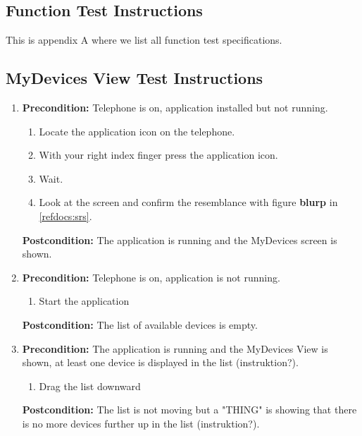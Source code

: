 \documentclass[a4paper]{article}
\newlength{\testlabellength}
\newenvironment{testlist}{\begin{enumerate}[label=\bfseries Instruction \thesubsection.\arabic* , labelindent=0pt, labelwidth=\testlabellength , leftmargin=2cm]}{\end{enumerate}}
\begin{document}
\newpage
\begin{appendices}

\section{Function Test Instructions} \label{appendix:section:functiontest}
This is appendix A where we list all function test specifications.

\subsection{MyDevices View Test Instructions}
\begin{testlist}

    \item \vspace{5mm} \textbf{Precondition:} Telephone is on, application installed but not running.
    			\begin{enumerate}
    				\item Locate the application icon on the telephone.
    				\item With your right index finger press the application icon.
	    			\item Wait.
    				\item Look at the screen and confirm the resemblance with figure \textbf{blurp} in \ref{refdocs:srs}.
    			\end{enumerate}
    			\textbf{Postcondition:} The application is running and the MyDevices screen is shown.
    		
    
	\item \vspace{5mm} \textbf{Precondition:} Telephone is on, application is not running.
    			\begin{enumerate}
                	\item Start the application
                \end{enumerate}
                \textbf{Postcondition:} The list of available devices is empty.
    
    \item \vspace{5mm} \textbf{Precondition:} The application is running and the MyDevices View is shown, at least one device is displayed in the list (instruktion?).
    			\begin{enumerate}
                	\item Drag the list downward
                \end{enumerate}
                \textbf{Postcondition:} The list is not moving but a "THING" is showing that there is no more devices further up in the list (instruktion?).
    

\end{testlist}
\end{appendices}
\end{document}
